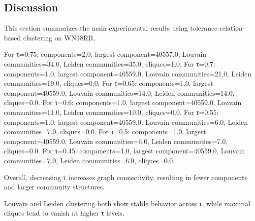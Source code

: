 \documentclass[conference]{IEEEtran}
\begin{document}
\subsection{Discussion}

This section summarizes the main experimental results using tolerance-relation-based clustering on WN18RR.

For τ=0.75: components=2.0, largest component=40557.0, Louvain communities=34.0, Leiden communities=35.0, cliques=1.0.
For τ=0.7: components=1.0, largest component=40559.0, Louvain communities=21.0, Leiden communities=19.0, cliques=0.0.
For τ=0.65: components=1.0, largest component=40559.0, Louvain communities=14.0, Leiden communities=14.0, cliques=0.0.
For τ=0.6: components=1.0, largest component=40559.0, Louvain communities=11.0, Leiden communities=10.0, cliques=0.0.
For τ=0.55: components=1.0, largest component=40559.0, Louvain communities=6.0, Leiden communities=7.0, cliques=0.0.
For τ=0.5: components=1.0, largest component=40559.0, Louvain communities=6.0, Leiden communities=7.0, cliques=0.0.
For τ=0.45: components=1.0, largest component=40559.0, Louvain communities=7.0, Leiden communities=6.0, cliques=0.0.

Overall, decreasing τ increases graph connectivity, resulting in fewer components and larger community structures.

Louvain and Leiden clustering both show stable behavior across τ, while maximal cliques tend to vanish at higher τ levels.
\end{document}
